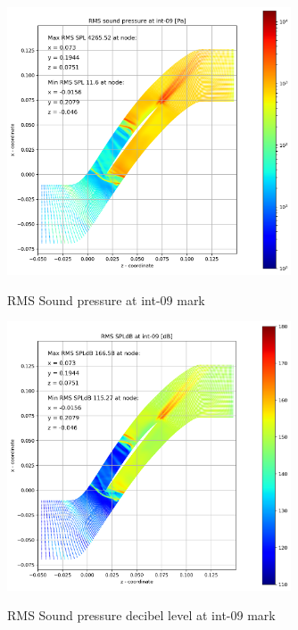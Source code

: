 \begin{figure}[ht]
  \centering
  \includegraphics[width=0.75\textwidth]{Figures/int-09-rms-spl.png} \label{int-09-rms-spl}
  \caption{RMS Sound pressure at int-09 mark}
  
  \vspace*{\floatsep}%

  \includegraphics[width=0.75\textwidth]{Figures/int-09-rms-spldb.png} \label{int-09-rms-spldb}
  \caption{RMS Sound pressure decibel level at int-09 mark}
\end{figure}
